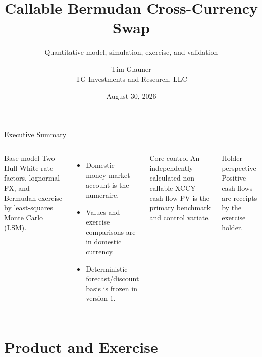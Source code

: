 \documentclass[aspectratio=169]{beamer}
\title[Callable Bermudan XCCY]{Callable Bermudan Cross-Currency Swap}
\subtitle{Quantitative model, simulation, exercise, and validation}
\author{Tim Glauner\\TG Investments and Research, LLC}
\date{August 30, 2026}
\begin{document}
\begin{frame}[plain]
  \titlepage
\end{frame}

\begin{frame}{Executive Summary}
  \begin{columns}[T,onlytextwidth]
      \begin{block}{Base model}
        Two Hull-White rate factors, lognormal FX, and Bermudan exercise by
        least-squares Monte Carlo (LSM).
      \end{block}
      \begin{itemize}
        \item Domestic money-market account is the numeraire.
        \item Values and exercise comparisons are in domestic currency.
        \item Deterministic forecast/discount basis is frozen in version 1.
      \end{itemize}
      \begin{block}{Core control}
        An independently calculated non-callable XCCY cash-flow PV is the
        primary benchmark and control variate.
      \end{block}
      \begin{alertblock}{Holder perspective}
        Positive cash flows are receipts by the exercise holder.
      \end{alertblock}
  \end{columns}
\end{frame}

\section{Product and Exercise}
\end{document}

